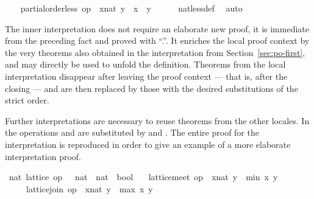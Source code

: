 \begin{isabellebody}
\isanewline
\ \ \isamarkupfalse%
\ {\isachardoublequoteopen}partial{\isacharunderscore}order{\isachardot}less\ op\ {\isasymle}\ {\isacharparenleft}x{\isacharcolon}{\isacharcolon}nat{\isacharparenright}\ y\ {\isacharequal}\ {\isacharparenleft}x\ {\isacharless}\ y{\isacharparenright}{\isachardoublequoteclose}\isanewline
\ \ \ \ \isamarkupfalse%
\ nat{\isachardot}less{\isacharunderscore}def\ \isamarkupfalse%
\ auto\isanewline
{}\isamarkupfalse%
%
\endisatagvisible
{\isafoldvisible}%
%
\isadelimvisible
%
\endisadelimvisible
%
\begin{isamarkuptext}%
The inner interpretation does not require an elaborate new
  proof, it is immediate from the preceding fact and proved with
  ``.''.  It enriches the local proof context by the very theorems
  also obtained in the interpretation from Section~\ref{sec:po-first},
  and  may directly be used to unfold the
  definition.  Theorems from the local interpretation disappear after
  leaving the proof context --- that is, after the closing
   --- and are then replaced by those with the desired
  substitutions of the strict order.%
\end{isamarkuptext}%
\isamarkuptrue%
%
\isamarkuptrue%
%
\begin{isamarkuptext}%
Further interpretations are necessary to reuse theorems from
  the other locales.  In  the operations \isa{{\isasymsqinter}} and
  \isa{{\isasymsqunion}} are substituted by  and
  .  The entire proof for the
  interpretation is reproduced in order to give an example of a more
  elaborate interpretation proof.%
\end{isamarkuptext}%
\isamarkuptrue%
%
\isadelimvisible
%
\endisadelimvisible
%
\isatagvisible
{}\isamarkupfalse%
\ nat{\isacharcolon}\ lattice\ {\isachardoublequoteopen}op\ {\isasymle}\ {\isacharcolon}{\isacharcolon}\ nat\ {\isasymRightarrow}\ nat\ {\isasymRightarrow}\ bool{\isachardoublequoteclose}\isanewline
\ \ \ {\isachardoublequoteopen}lattice{\isachardot}meet\ op\ {\isasymle}\ {\isacharparenleft}x{\isacharcolon}{\isacharcolon}nat{\isacharparenright}\ y\ {\isacharequal}\ min\ x\ y{\isachardoublequoteclose}\isanewline
\ \ \ \ \ {\isachardoublequoteopen}lattice{\isachardot}join\ op\ {\isasymle}\ {\isacharparenleft}x{\isacharcolon}{\isacharcolon}nat{\isacharparenright}\ y\ {\isacharequal}\ max\ x\ y{\isachardoublequoteclose}\isanewline

\end{isabellebody}
